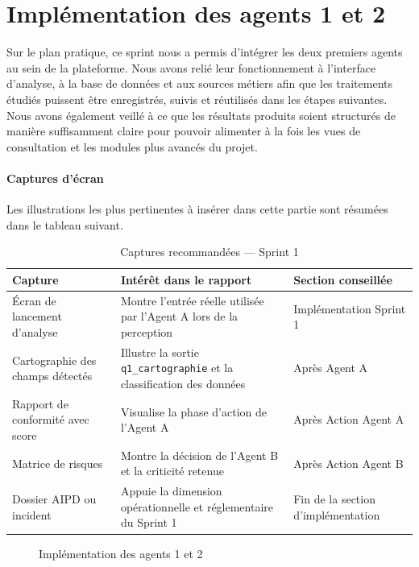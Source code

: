 \documentclass[12pt,a4paper]{report}
\begin{document}
\section{Implémentation des agents 1 et 2}

Sur le plan pratique, ce sprint nous a permis d'intégrer les deux premiers agents au sein de la plateforme. Nous avons relié leur fonctionnement à l'interface d'analyse, à la base de données et aux sources métiers afin que les traitements étudiés puissent être enregistrés, suivis et réutilisés dans les étapes suivantes. Nous avons également veillé à ce que les résultats produits soient structurés de manière suffisamment claire pour pouvoir alimenter à la fois les vues de consultation et les modules plus avancés du projet.

\paragraph{Captures d'écran}

Les illustrations les plus pertinentes à insérer dans cette partie sont résumées dans le tableau suivant.

\begin{table}[H]
\centering
\caption{Captures recommandées --- Sprint 1}
\label{tab:captures_sprint1}
\begin{tabularx}{\textwidth}{|p{3.4cm}|X|p{3.2cm}|}
\hline
\textbf{Capture} & \textbf{Intérêt dans le rapport} & \textbf{Section conseillée} \\
\hline
Écran de lancement d'analyse & Montre l'entrée réelle utilisée par l'Agent A lors de la perception & Implémentation Sprint 1 \\
\hline
Cartographie des champs détectés & Illustre la sortie \texttt{q1\_cartographie} et la classification des données & Après Agent A \\
\hline
Rapport de conformité avec score & Visualise la phase d'action de l'Agent A & Après Action Agent A \\
\hline
Matrice de risques & Montre la décision de l'Agent B et la criticité retenue & Après Action Agent B \\
\hline
Dossier AIPD ou incident & Appuie la dimension opérationnelle et réglementaire du Sprint 1 & Fin de la section d'implémentation \\
\hline
\end{tabularx}
\end{table}

\begin{figure}[H]
\centering
{}
\caption{Implémentation des agents 1 et 2}
\label{fig:realisation_sprint1}
\end{figure}
\end{document}
